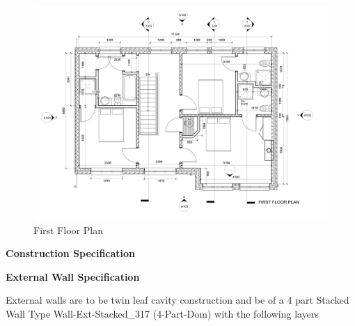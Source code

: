 \begin{figure}[th]
	\centering
	\includegraphics[width=1.0\linewidth]{img/P01FirstFloorLevel.jpg}
	\caption{First Floor Plan}
	\label{fig:p01firstfloorlevel}
\end{figure}



\begin{flushleft}
	\Large\textbf{Construction Specification}\\
\end{flushleft}

\textbf{External Wall Specification} 

External walls are to be twin leaf cavity construction and be of a 4 part Stacked Wall Type
Wall-Ext-Stacked\_317 (4-Part-Dom) with the following layers

